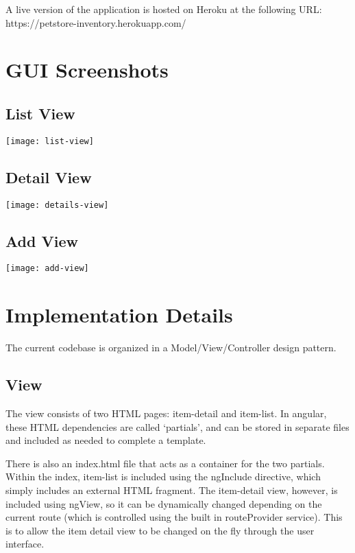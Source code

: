 \documentclass[letterpaper, 12pt]{article}
\begin{document}
\noindent A live version of the application is hosted on Heroku at the following URL:\\
https://petstore-inventory.herokuapp.com/

\section{GUI Screenshots}

%
%
\subsection{List View}
  \begin{centering}
  \texttt{[image: list-view]}
    \end{centering}
%
\subsection{Detail View}
  \begin{centering}
  \texttt{[image: details-view]}
    \end{centering}
%
\subsection{Add View}
  \begin{centering}
  \texttt{[image: add-view]}
    \end{centering}
    
\section{Implementation Details}
\noindent The current codebase is organized in a Model/View/Controller design pattern.

\subsection{View}
\noindent The view consists of two HTML pages: item-detail and item-list. In angular, these HTML dependencies are called `partials', and can be stored in separate files and included as needed to complete a template.

\hspace{1mm}

\noindent There is also an index.html file that acts as a container for the two partials. Within the index, item-list is included using the ngInclude directive, which simply includes an external HTML fragment. The item-detail view, however, is included using ngView, so it can be dynamically changed depending on the current route (which is controlled using the built in routeProvider service). This is to allow the item detail view to be changed on the fly through the user interface.
\end{document}
